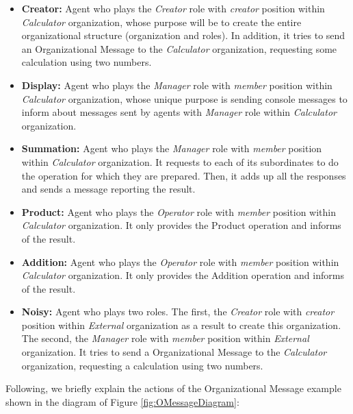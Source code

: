 \begin{itemize}
\item \textbf{Creator:} Agent who plays the \textit{Creator} role with \textit{creator} position within
  \textit{Calculator} organization, whose purpose will be to create the entire organizational structure
  (organization and roles). In addition, it tries to send an Organizational Message to the \textit{Calculator}
  organization, requesting some calculation using two numbers.
\item \textbf{Display:} Agent who plays the \textit{Manager} role with \textit{member} position within
  \textit{Calculator} organization, whose unique purpose is sending console messages to inform about messages
  sent by agents with \textit{Manager} role within \textit{Calculator} organization.
\item \textbf{Summation:} Agent who plays the \textit{Manager} role with \textit{member} position within
  \textit{Calculator} organization. It requests to each of its subordinates to do the operation for which
  they are prepared. Then, it adds up all the responses and sends a message reporting the result.
\item \textbf{Product:} Agent who plays the \textit{Operator} role with \textit{member} position within
  \textit{Calculator} organization. It only provides the Product operation and informs of the result.
\item \textbf{Addition:} Agent who plays the \textit{Operator} role with \textit{member} position within
  \textit{Calculator} organization. It only provides the Addition operation and informs of the result.
\item \textbf{Noisy:} Agent who plays two roles. The first, the \textit{Creator} role with \textit{creator}
  position within \textit{External} organization as a result to create this organization. The second, the
  \textit{Manager} role with \textit{member} position within \textit{External} organization. It tries to send
  a Organizational Message to the \textit{Calculator} organization, requesting a calculation using two
  numbers.
\end{itemize}

Following, we briefly explain the actions of the Organizational Message example shown in the diagram of Figure \ref{fig:OMessageDiagram}:

